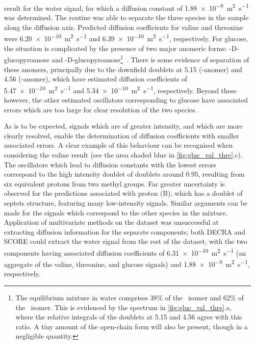 result for the water signal, for which a diffusion constant of
\qty{1.88e-9}{\meter\squared\per\second} was determined. The routine
was able to separate the three species in the sample along the diffusion
axis. Predicted diffusion coefficients for valine and threonine were
\qty{6.20e-10}{\meter\squared\per\second} and
\qty{6.39e-10}{\meter\squared\per\second}, respectively. For glucose, the situation is
complicated by the presence of two major anomeric forms:
\textalpha-D-glucopyroanose and
\textbeta-D-glucopyroanose\footnote{
    The equilibrium mixture in water comprises 38\% of the \textalpha\ isomer
    and 62\% of the \textbeta\ isomer.
    This is evidenced by the
    spectrum in \cref{fig:gluc_val_thre}.a, where the relative integrals of
    the doublets at \qty{5.15}{\partspermillion} and
    \qty{4.56}{\partspermillion} agree with this ratio.
    A tiny amount of the open-chain form will
    also be present, though in a negligible quantity.
}~\cite[Chapter 3]{Davis2002}.
There is some evidence of separation of these anomers, principally due
to the downfield doublets at \qty{5.15}{\partspermillion} (\textalpha-anomer) and
\qty{4.56}{\partspermillion} (\textbeta-anomer), which have estimated diffusion
coefficients of \qty{5.47e-10}{\meter\squared\per\second}
and \qty{5.34e-10}{\meter\squared\per\second}, respectively. Beyond these
however, the other estimated oscillators corresponding to glucose have
associated errors which are too large for clear resolution of the two species.
\label{corr:gluc-D}

As is to be expected, signals which are of greater intensity, and which are
more clearly resolved, enable the determination of diffusion coefficients with
smaller associated errors. A clear example of this behaviour can be recognised when
considering the valine result (see the area shaded blue in
\cref{fig:gluc_val_thre}.c). The
oscillators which lead to diffusion constants with the lowest errors correspond to
the high intensity doublet of doublets around \qty{0.95}{\partspermillion},
resulting from six equivalent protons from two methyl groups. Far
greater uncertainty is observed for the predictions associated with proton (B),
which has a doublet of septets structure, featuring many low-intensity signals.
Similar arguments can be made for the signals which correspond to the other
species in the mixture.
Application of multivariate methods on the dataset was unsuccessful at
extracting diffusion information for the separate components; both
\ac{DECRA} and \ac{SCORE} could extract the water
signal from the rest of the dataset, with the two components having associated
diffusion coefficients of \qty{6.31e-10}{\meter\squared\per\second} (an
aggregate of the valine, threonine, and glucose signals) and
\qty{1.88e-9}{\meter\squared\per\second}, respectively.
